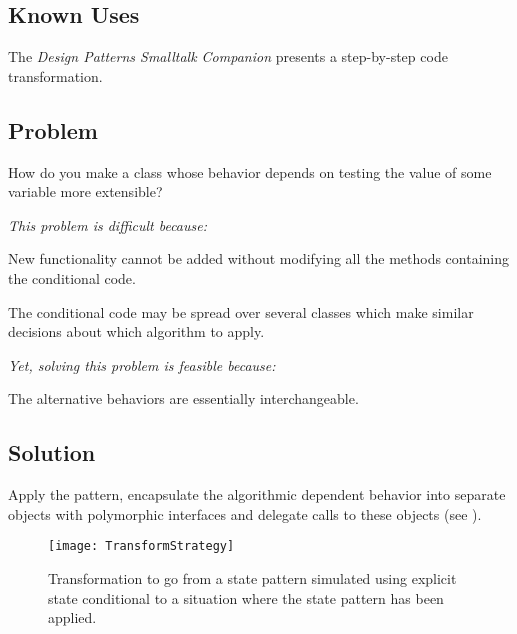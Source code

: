 \documentclass[a4paper,10pt,twoside]{book}
\begin{document}
\subsection*{Known Uses}

The \emph{Design Patterns Smalltalk Companion} \cite{Alpe98a} presents a step-by-step code transformation. 




\subsection*{Problem}

How do you make a class whose behavior depends on testing the value of some variable more extensible?

\emph{This problem is difficult because:}

\begin{bulletlist}
\item New functionality cannot be added without modifying all the methods containing the conditional code. 

\item The conditional code may be spread over several classes which make similar decisions about which algorithm to apply.
\end{bulletlist}

\emph{Yet, solving this problem is feasible because:}

\begin{bulletlist}
\item The alternative behaviors are essentially interchangeable.
\end{bulletlist}

\subsection*{Solution}

Apply the  pattern, \ie encapsulate the algorithmic dependent behavior into separate objects with polymorphic interfaces and delegate calls to these objects (see ). 

\begin{figure}[h]
\begin{center}
\texttt{[image: TransformStrategy]}
\caption{Transformation to go from a state pattern simulated using explicit state conditional to a situation where the state pattern has been applied. }
\end{center}
\end{figure}
\end{document}
